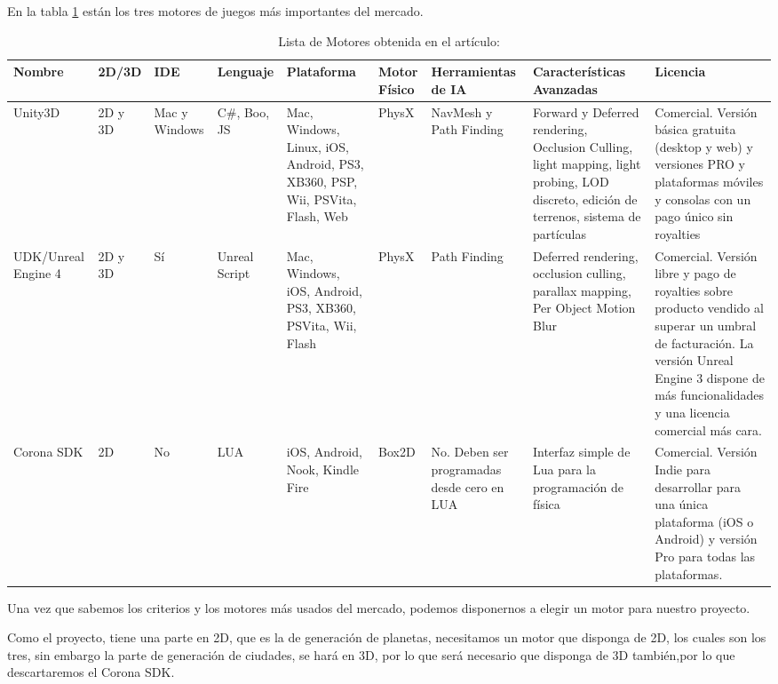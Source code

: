 En la tabla \ref{Tabla3} están los tres motores de juegos más importantes del mercado.

\begin{table}

\begin{center}   
	\begin{tabular}{| p{2cm} | p{2cm} | p{2cm} | p{2.5cm} | p{2.5cm} | p{2cm} | p{2cm} | p{2.5cm} | p{2.5cm}|}
		\hline 
		Nombre & 2D/3D & IDE & Lenguaje & Plataforma & Motor Físico & Herramientas de IA & Características Avanzadas & Licencia\\
   		\hline 
   			Unity3D & 2D y 3D & Mac y Windows & C\#, Boo, JS & Mac, Windows,
   			Linux, iOS, Android, PS3, XB360, PSP, Wii, PSVita, Flash,
   			Web & PhysX &  NavMesh y Path Finding & Forward y Deferred
   			rendering, Occlusion Culling, light mapping, light probing, LOD discreto, edición de terrenos, sistema de partículas & Comercial. Versión básica
   			gratuita (desktop y web) y versiones PRO y plataformas
   			móviles y consolas con un pago único sin royalties\\
   		\hline
    		UDK/Unreal Engine 4& 2D y 3D & Sí & Unreal Script & Mac, Windows,
    		iOS, Android, PS3, XB360, PSVita, Wii, Flash & PhysX &Path Finding &  Deferred rendering, occlusion culling, parallax mapping, Per Object Motion
    		Blur  &  Comercial. Versión libre y pago de royalties sobre producto vendido al superar un umbral de facturación. La versión Unreal Engine 3 dispone de más funcionalidades y una licencia comercial más cara.\\
    	\hline
        	Corona SDK & 2D & No & LUA & iOS, Android, Nook, Kindle Fire & Box2D & No. Deben ser programadas desde cero en LUA  & Interfaz simple de Lua para
        	la programación de física & Comercial. Versión Indie para desarrollar para una única plataforma (iOS o Android) y versión Pro para todas las
        	plataformas.\\
    	\hline
     \end{tabular}
\end{center}

\caption{Lista de Motores obtenida en el artículo: \cite{B8}} \label{Tabla3}
\end{table}

Una vez que sabemos los criterios y los motores más usados del mercado, podemos disponernos a elegir un motor para nuestro proyecto.

Como el proyecto, tiene una parte en 2D, que es la de generación de planetas, necesitamos un motor que disponga de 2D, los cuales son los tres, sin embargo la parte de generación de ciudades, se hará en 3D, por lo que será necesario que disponga de 3D también,por lo que descartaremos el Corona SDK.

